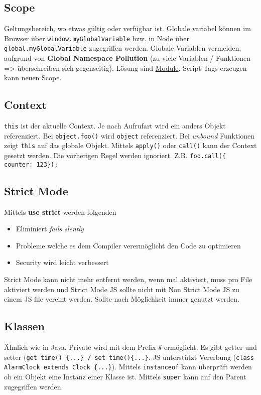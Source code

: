 \documentclass[11pt,twoside,landscape]{article}
\begin{document}
\begin{multicols}{4}
\subsection*{Scope}
\label{sec:org7b4bbd2}
Geltungsbereich, wo etwas gültig oder verfügbar ist. Globale variabel können im Browser über \texttt{window.myGlobalVariable} bzw. in Node über \texttt{global.myGlobalVariable} zugegriffen werden. Globale Variablen vermeiden, aufgrund von \textbf{Global Namespace Pollution} (zu viele Variablen / Funktionen => überschreiben sich gegenseitig). Lösung sind \hyperref[sec:orge2cc30a]{Module}. Script-Tags erzeugen kann neuen Scope.

\subsection*{Context}
\label{sec:org8b4c0b6}
\texttt{this} ist der aktuelle Context. Je nach Aufrufart wird ein anders Objekt referenziert. Bei \texttt{object.foo()} wird \texttt{object} referenziert. Bei \emph{unbound} Funktionen zeigt \texttt{this} auf das globale Objekt. Mittels \texttt{apply()} oder \texttt{call()} kann der Context gesetzt werden. Die vorherigen Regel werden ignoriert. Z.B. \texttt{foo.call(\{ counter: 123\});}

\subsection*{Strict Mode}
\label{sec:org456f52a}
Mittels \textbf{use strict} werden folgenden 
\begin{itemize}
\item Eliminiert \emph{fails slently}
\item Probleme welche es dem Compiler verermöglicht den Code zu optimieren
\item Security wird leicht verbessert
\end{itemize}

Strict Mode kann nicht mehr entfernt werden, wenn mal aktiviert, muss pro File aktiviert werden und Strict Mode JS sollte nicht mit Non Strict Mode JS zu einem JS file vereint werden. Sollte nach Möglichkeit immer genutzt werden.

\subsection*{Klassen}
\label{sec:org4d85918}
Ähnlich wie in Java. Private wird mit dem Prefix \texttt{\#} ermöglicht. Es gibt getter und setter (\texttt{get time() \{...\} / set time()\{...\}}. JS unterstützt Vererbung (\texttt{class AlarmClock extends Clock \{...\}}). Mittels \texttt{instanceof} kann überprüft werden ob ein Objekt eine Instanz einer Klasse ist. Mittels \texttt{super} kann auf den Parent zugegriffen werden.


\end{multicols}
\end{document}
